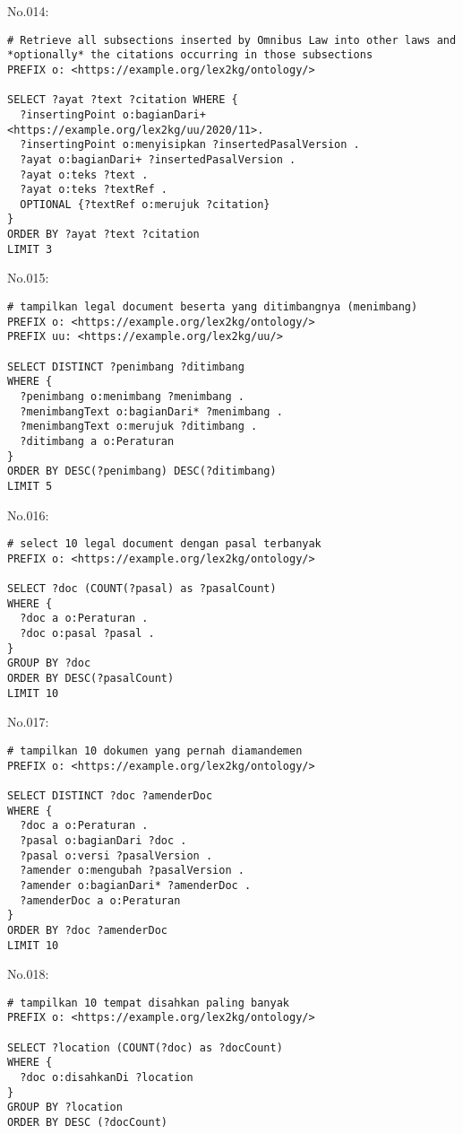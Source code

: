 \noindent No.014:
\begin{lstlisting}
# Retrieve all subsections inserted by Omnibus Law into other laws and *optionally* the citations occurring in those subsections
PREFIX o: <https://example.org/lex2kg/ontology/>

SELECT ?ayat ?text ?citation WHERE {
  ?insertingPoint o:bagianDari+ <https://example.org/lex2kg/uu/2020/11>.
  ?insertingPoint o:menyisipkan ?insertedPasalVersion .
  ?ayat o:bagianDari+ ?insertedPasalVersion .
  ?ayat o:teks ?text .
  ?ayat o:teks ?textRef .
  OPTIONAL {?textRef o:merujuk ?citation}
}
ORDER BY ?ayat ?text ?citation
LIMIT 3
\end{lstlisting}


\noindent No.015:
\begin{lstlisting}
# tampilkan legal document beserta yang ditimbangnya (menimbang)
PREFIX o: <https://example.org/lex2kg/ontology/>
PREFIX uu: <https://example.org/lex2kg/uu/>

SELECT DISTINCT ?penimbang ?ditimbang
WHERE {
  ?penimbang o:menimbang ?menimbang .
  ?menimbangText o:bagianDari* ?menimbang .
  ?menimbangText o:merujuk ?ditimbang .
  ?ditimbang a o:Peraturan
}
ORDER BY DESC(?penimbang) DESC(?ditimbang)
LIMIT 5
\end{lstlisting}


\noindent No.016:
\begin{lstlisting}
# select 10 legal document dengan pasal terbanyak
PREFIX o: <https://example.org/lex2kg/ontology/>

SELECT ?doc (COUNT(?pasal) as ?pasalCount)
WHERE {
  ?doc a o:Peraturan .
  ?doc o:pasal ?pasal .
}
GROUP BY ?doc
ORDER BY DESC(?pasalCount)
LIMIT 10

\end{lstlisting}


\noindent No.017:
\begin{lstlisting}
# tampilkan 10 dokumen yang pernah diamandemen
PREFIX o: <https://example.org/lex2kg/ontology/>

SELECT DISTINCT ?doc ?amenderDoc
WHERE {
  ?doc a o:Peraturan .
  ?pasal o:bagianDari ?doc .
  ?pasal o:versi ?pasalVersion .
  ?amender o:mengubah ?pasalVersion .
  ?amender o:bagianDari* ?amenderDoc .
  ?amenderDoc a o:Peraturan
}
ORDER BY ?doc ?amenderDoc
LIMIT 10
\end{lstlisting}


\noindent No.018:
\begin{lstlisting}
# tampilkan 10 tempat disahkan paling banyak
PREFIX o: <https://example.org/lex2kg/ontology/>

SELECT ?location (COUNT(?doc) as ?docCount)
WHERE {
  ?doc o:disahkanDi ?location
}
GROUP BY ?location
ORDER BY DESC (?docCount)
\end{lstlisting}


